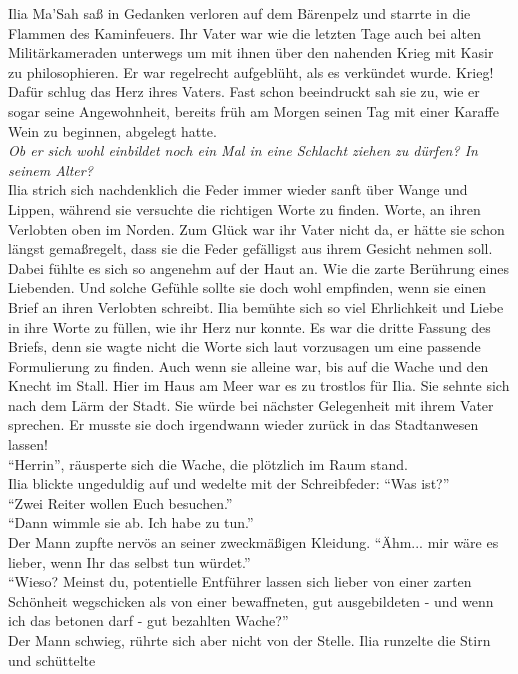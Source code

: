Ilia Ma'Sah saß in Gedanken verloren auf dem Bärenpelz und starrte in die Flammen des Kaminfeuers. 
Ihr Vater war wie die letzten Tage auch bei alten Militärkameraden unterwegs um mit ihnen über den 
nahenden Krieg mit Kasir zu philosophieren. Er war regelrecht aufgeblüht, als es verkündet wurde. 
Krieg! Dafür schlug das Herz ihres Vaters. Fast schon beeindruckt sah sie zu, wie er sogar seine 
Angewohnheit, bereits früh am Morgen seinen Tag mit einer Karaffe Wein zu beginnen, abgelegt 
hatte.\\
\textit{Ob er sich wohl einbildet noch ein Mal in eine Schlacht ziehen zu dürfen? In seinem 
Alter?}\\
Ilia strich sich nachdenklich die Feder immer wieder sanft über Wange und Lippen, während sie 
versuchte die richtigen Worte zu finden. Worte, an ihren Verlobten oben im Norden. Zum Glück war 
ihr Vater nicht da, er hätte sie schon längst gemaßregelt, dass sie die Feder gefälligst aus ihrem 
Gesicht nehmen soll. Dabei fühlte es sich so angenehm auf der Haut an. Wie die zarte Berührung 
eines Liebenden. Und solche Gefühle sollte sie doch wohl empfinden, wenn sie einen Brief an ihren 
Verlobten schreibt. Ilia bemühte sich so viel Ehrlichkeit und Liebe in ihre Worte zu füllen, wie 
ihr Herz nur konnte. Es war die dritte Fassung des Briefs, denn sie wagte nicht die Worte sich laut 
vorzusagen um eine passende Formulierung zu finden. Auch wenn sie alleine war, bis auf die Wache 
und den Knecht im Stall. Hier im Haus am Meer war es zu trostlos für Ilia. Sie sehnte sich nach dem 
Lärm der Stadt. Sie würde bei nächster Gelegenheit mit ihrem Vater sprechen. Er musste sie doch 
irgendwann wieder zurück in das Stadtanwesen lassen!\\
``Herrin'', räusperte sich die Wache, die plötzlich im Raum stand.\\
Ilia blickte ungeduldig auf und wedelte mit der Schreibfeder: ``Was ist?''\\
``Zwei Reiter wollen Euch besuchen.''\\
``Dann wimmle sie ab. Ich habe zu tun.''\\
Der Mann zupfte nervös an seiner zweckmäßigen Kleidung. ``Ähm... mir wäre es lieber, wenn Ihr das 
selbst tun würdet.''\\
``Wieso? Meinst du, potentielle Entführer lassen sich lieber von einer zarten Schönheit wegschicken 
als von einer bewaffneten, gut ausgebildeten - und wenn ich das betonen darf - gut bezahlten 
Wache?''\\
Der Mann schwieg, rührte sich aber nicht von der Stelle. Ilia runzelte die Stirn und schüttelte 
